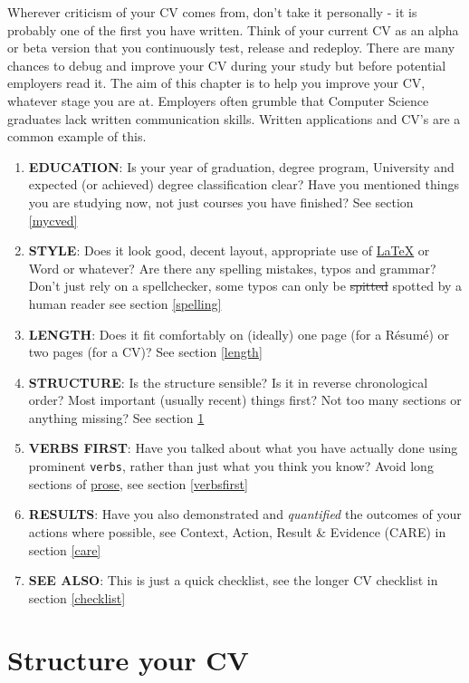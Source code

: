 \documentclass[
]{book}
\providecommand{\tightlist}{%
  \setlength{\itemsep}{0pt}\setlength{\parskip}{0pt}}
\begin{document}
Wherever criticism of your CV comes from, don't take it personally - it is probably one of the first you have written. Think of your current CV as an alpha or beta version that you continuously test, release and redeploy. There are many chances to debug and improve your CV during your study but before potential employers read it. The aim of this chapter is to help you improve your CV, whatever stage you are at. Employers often grumble that Computer Science graduates lack written communication skills. Written applications and CV's are a common example of this.

\begin{enumerate}
\def\labelenumi{\arabic{enumi}.}
\tightlist
\item
  \textbf{EDUCATION}: Is your year of graduation, degree program, University and expected (or achieved) degree classification clear? Have you mentioned things you are studying now, not just courses you have finished? See section \ref{mycved}
\item
  \textbf{STYLE}: Does it look good, decent layout, appropriate use of \href{https://latex4year1.netlify.app/}{LaTeX} or Word or whatever? Are there any spelling mistakes, typos and grammar? Don't just rely on a spellchecker, some typos can only be \sout{spitted} spotted by a human reader see section \ref{spelling}
\item
  \textbf{LENGTH}: Does it fit comfortably on (ideally) one page (for a Résumé) or two pages (for a CV)? See section \ref{length}
\item
  \textbf{STRUCTURE}: Is the structure sensible? Is it in reverse chronological order? Most important (usually recent) things first? Not too many sections or anything missing? See section \ref{mycvst}
\item
  \textbf{VERBS FIRST}: Have you talked about what you have actually done using prominent \texttt{verbs}, rather than just what you think you know? Avoid long sections of \href{https://en.wikipedia.org/wiki/Prose}{prose}, see section \ref{verbsfirst}
\item
  \textbf{RESULTS}: Have you also demonstrated and \emph{quantified} the outcomes of your actions where possible, see Context, Action, Result \& Evidence (CARE) in section \ref{care}
\item
  \textbf{SEE ALSO}: This is just a quick checklist, see the longer CV checklist in section \ref{checklist}
\end{enumerate}

\hypertarget{mycvst}{%
\section{Structure your CV}\label{mycvst}}
\end{document}
